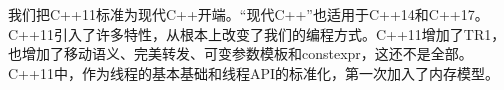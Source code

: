 

我们把C++11标准为现代C++开端。“现代C++”也适用于C++14和C++17。C++11引入了许多特性，从根本上改变了我们的编程方式。C++11增加了TR1，也增加了移动语义、完美转发、可变参数模板和constexpr，这还不是全部。C++11中，作为线程的基本基础和线程API的标准化，第一次加入了内存模型。